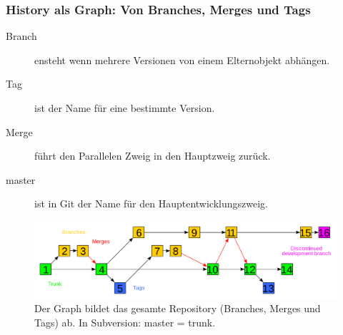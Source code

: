 \documentclass{beamer}
\begin{document}
\begin{frame}\frametitle{History als Graph: Von Branches, Merges und Tags}
\begin{description}
\item[Branch] ensteht wenn mehrere Versionen von einem Elternobjekt abhängen.
\item[Tag] ist der Name für eine bestimmte Version. 
\item[Merge] führt den Parallelen Zweig in den Hauptzweig zurück.
\item[master] ist in Git der Name für den Hauptentwicklungszweig.
\end{description}

\begin{figure}
\includegraphics[scale=0.15]{2000px-Subversion_project_visualization} 
{\tiny \caption{Der Graph bildet das gesamte Repository (Branches, Merges und Tags) ab. In Subversion: master = trunk.}}
\end{figure}
\end{frame}
\end{document}
